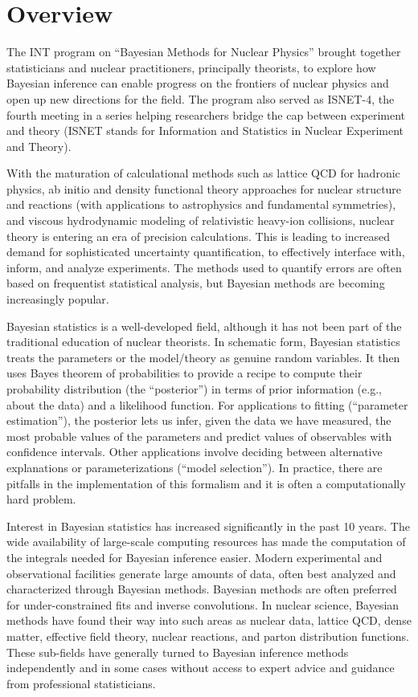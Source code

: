 
\section{Overview}  \label{sec:overview}

\bi
  \I The INT program on ``Bayesian Methods for Nuclear Physics'' brought together statisticians
      and nuclear practitioners, principally theorists, to explore how Bayesian
	  inference can enable progress on the frontiers of nuclear
	  physics and open up new directions for the field.
  \I The program also served as ISNET-4, the fourth meeting in a series helping researchers
      bridge the cap between experiment and theory
      (ISNET stands for Information and Statistics in Nuclear Experiment and Theory).   
\ei

With the maturation of calculational methods such as lattice QCD for hadronic
physics, ab initio and density functional theory approaches for nuclear
structure and reactions (with applications to astrophysics and fundamental
symmetries), and viscous hydrodynamic modeling of relativistic heavy-ion
collisions, nuclear theory is entering an era of precision calculations. This
is leading to increased demand for sophisticated uncertainty quantification,
to effectively interface with, inform, and analyze experiments. The methods
used to quantify errors are often based on frequentist statistical analysis,
but Bayesian methods are becoming increasingly popular.

Bayesian statistics is a well-developed field, although it has not been part
of the traditional education of nuclear theorists. In schematic form, Bayesian
statistics treats the parameters or the model/theory as genuine random
variables. It then uses Bayes theorem of probabilities to provide a recipe to
compute their probability distribution (the “posterior”) in terms of prior
information (e.g., about the data) and a likelihood function. For applications
to fitting (“parameter estimation”), the posterior lets us infer, given the
data we have measured, the most probable values of the parameters and predict
values of observables with confidence intervals. Other applications involve
deciding between alternative explanations or parameterizations (“model
selection”). In practice, there are pitfalls in the implementation of this
formalism and it is often a computationally hard problem.

Interest in Bayesian statistics has increased significantly in the past 10
years. The wide availability of large-scale computing resources has made the
computation of the integrals needed for Bayesian inference easier. Modern
experimental and observational facilities generate large amounts of data,
often best analyzed and characterized through Bayesian methods. Bayesian
methods are often preferred for under-constrained fits and inverse
convolutions. In nuclear science, Bayesian methods have found their way into
such areas as nuclear data, lattice QCD, dense matter, effective field theory,
nuclear reactions, and parton distribution functions. These sub-fields have
generally turned to Bayesian inference methods independently and in some cases
without access to expert advice and guidance from professional statisticians.


